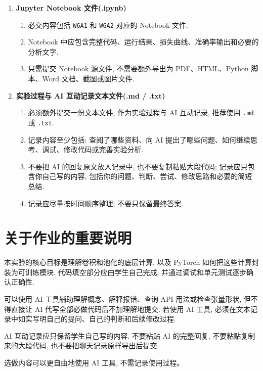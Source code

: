 \documentclass{../../nndlcourse}
\begin{document}
\begin{enumerate}
    \item \textbf{Jupyter Notebook 文件(.ipynb)}
    \begin{enumerate}
        \item 必交内容包括 \texttt{W6A1} 和 \texttt{W6A2} 对应的 Notebook 文件.
        \item Notebook 中应包含完整代码、运行结果、损失曲线、准确率输出和必要的分析文字.
        \item 只需提交 Notebook 源文件, 不需要额外导出为 PDF、HTML、Python 脚本、Word 文档、截图或图片文件.
    \end{enumerate}
    \item \textbf{实验过程与 AI 互动记录文本文件(.md / .txt)}
    \begin{enumerate}
        \item 必须额外提交一份文本文件, 作为实验过程与 AI 互动记录, 推荐使用 \texttt{.md} 或 \texttt{.txt}.
        \item 记录内容至少包括: 查阅了哪些资料、向 AI 提出了哪些问题、如何继续思考、调试、修改代码或完善实验分析.
        \item 不要把 AI 的回复原文放入记录中, 也不要复制粘贴大段代码; 记录应只包含你自己写的内容, 包括你的问题、判断、尝试、修改思路和必要的简短总结.
        \item 记录应尽量按时间顺序整理, 不要只保留最终答案.
    \end{enumerate}
\end{enumerate}


\section{关于作业的重要说明}

本实验的核心目标是理解卷积和池化的底层计算, 以及 PyTorch 如何把这些计算封装为可训练模块. 代码填空部分应由学生自己完成, 并通过调试和单元测试逐步确认正确性.

可以使用 AI 工具辅助理解概念、解释报错、查询 API 用法或检查张量形状, 但不得直接让 AI 代写全部必做代码后不加理解地提交. 若使用 AI 工具, 必须在文本记录中如实写明自己的提问、自己的判断和后续修改过程.

AI 互动记录应只保留学生自己写的内容. 不要粘贴 AI 的完整回复, 不要粘贴复制来的大段代码, 也不要把聊天记录原样导出后提交.

选做内容可以更自由地使用 AI 工具, 不需记录使用过程。
\end{document}
